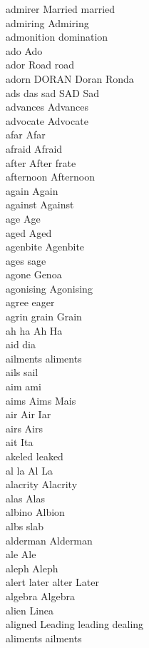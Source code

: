 admirer Married married\\
admiring Admiring\\
admonition domination\\
ado Ado\\
ador Road road\\
adorn DORAN Doran Ronda\\
ads das sad SAD Sad\\
advances Advances\\
advocate Advocate\\
afar Afar\\
afraid Afraid\\
after After frate\\
afternoon Afternoon\\
again Again\\
against Against\\
age Age\\
aged Aged\\
agenbite Agenbite\\
ages sage\\
agone Genoa\\
agonising Agonising\\
agree eager\\
agrin grain Grain\\
ah ha Ah Ha\\
aid dia\\
ailments aliments\\
ails sail\\
aim ami\\
aims Aims Mais\\
air Air Iar\\
airs Airs\\
ait Ita\\
akeled leaked\\
al la Al La\\
alacrity Alacrity\\
alas Alas\\
albino Albion\\
albs slab\\
alderman Alderman\\
ale Ale\\
aleph Aleph\\
alert later alter Later\\
algebra Algebra\\
alien Linea\\
aligned Leading leading dealing\\
aliments ailments\\
